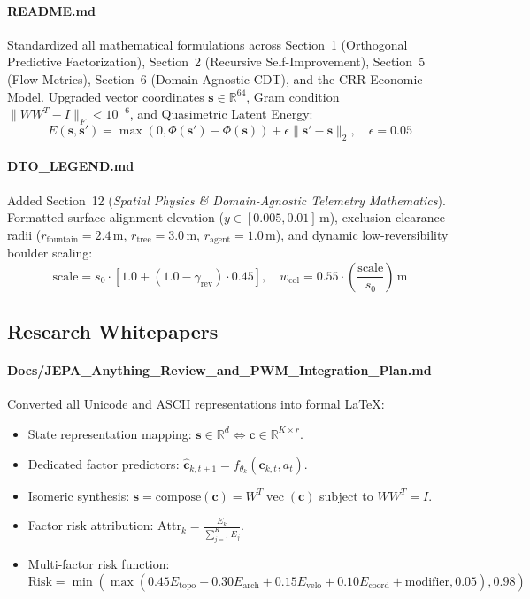 \documentclass[11pt,a4paper]{article}
\begin{document}
\paragraph{README.md}
Standardized all mathematical formulations across Section~1 (Orthogonal Predictive Factorization), Section~2 (Recursive Self-Improvement), Section~5 (Flow Metrics), Section~6 (Domain-Agnostic CDT), and the CRR Economic Model. Upgraded vector coordinates $\mathbf{s} \in \mathbb{R}^{64}$, Gram condition $\|W W^T - I\|_F < 10^{-6}$, and Quasimetric Latent Energy:
\begin{equation}
E(\mathbf{s}, \mathbf{s}') = \max(0, \Phi(\mathbf{s}') - \Phi(\mathbf{s})) + \epsilon \|\mathbf{s}' - \mathbf{s}\|_2, \quad \epsilon = 0.05
\end{equation}

\paragraph{DTO\_LEGEND.md}
Added Section~12 (\textit{Spatial Physics \& Domain-Agnostic Telemetry Mathematics}). Formatted surface alignment elevation ($y \in [0.005, 0.01]\,\text{m}$), exclusion clearance radii ($r_{\text{fountain}} = 2.4\,\text{m}$, $r_{\text{tree}} = 3.0\,\text{m}$, $r_{\text{agent}} = 1.0\,\text{m}$), and dynamic low-reversibility boulder scaling:
\begin{equation}
\text{scale} = s_0 \cdot \left[1.0 + (1.0 - \gamma_{\text{rev}}) \cdot 0.45\right], \quad w_{\text{col}} = 0.55 \cdot \left(\frac{\text{scale}}{s_0}\right)\,\text{m}
\end{equation}

\subsection{Research Whitepapers}

\paragraph{Docs/JEPA\_Anything\_Review\_and\_PWM\_Integration\_Plan.md}
Converted all Unicode and ASCII representations into formal \LaTeX{}:
\begin{itemize}
    \item State representation mapping: $\mathbf{s} \in \mathbb{R}^d \iff \mathbf{c} \in \mathbb{R}^{K \times r}$.
    \item Dedicated factor predictors: $\hat{\mathbf{c}}_{k, t+1} = f_{\theta_k}(\mathbf{c}_{k, t}, a_t)$.
    \item Isomeric synthesis: $\mathbf{s} = \text{compose}(\mathbf{c}) = W^T \operatorname{vec}(\mathbf{c})$ subject to $W W^T = I$.
    \item Factor risk attribution: $\text{Attr}_k = \frac{E_k}{\sum_{j=1}^K E_j}$.
    \item Multi-factor risk function:
    \begin{equation}
    \text{Risk} = \min\left(\max\left(0.45 E_{\text{topo}} + 0.30 E_{\text{arch}} + 0.15 E_{\text{velo}} + 0.10 E_{\text{coord}} + \text{modifier}, 0.05\right), 0.98\right)
    \end{equation}
\end{itemize}
\end{document}
